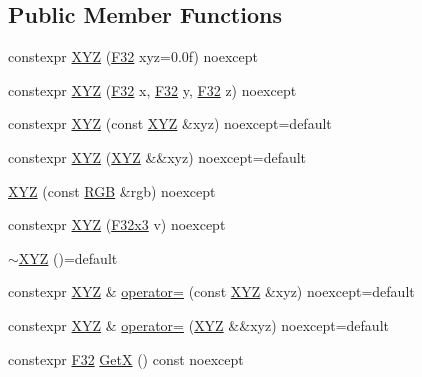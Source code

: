 \subsection*{Public Member Functions}
\begin{DoxyCompactItemize}
\item 
constexpr \mbox{\hyperlink{structmage_1_1_x_y_z_af8b9ef53daa7463097c6397644a24ebf}{X\+YZ}} (\mbox{\hyperlink{namespacemage_aa97e833b45f06d60a0a9c4fc22ae02c0}{F32}} xyz=0.\+0f) noexcept
\item 
constexpr \mbox{\hyperlink{structmage_1_1_x_y_z_af1a6e6dd912ef8513640bd7a45af01d5}{X\+YZ}} (\mbox{\hyperlink{namespacemage_aa97e833b45f06d60a0a9c4fc22ae02c0}{F32}} x, \mbox{\hyperlink{namespacemage_aa97e833b45f06d60a0a9c4fc22ae02c0}{F32}} y, \mbox{\hyperlink{namespacemage_aa97e833b45f06d60a0a9c4fc22ae02c0}{F32}} z) noexcept
\item 
constexpr \mbox{\hyperlink{structmage_1_1_x_y_z_a340b36d0ef87c20f3ff4123e71fb6894}{X\+YZ}} (const \mbox{\hyperlink{structmage_1_1_x_y_z}{X\+YZ}} \&xyz) noexcept=default
\item 
constexpr \mbox{\hyperlink{structmage_1_1_x_y_z_abfabc56fbe50948bc3d894178685453a}{X\+YZ}} (\mbox{\hyperlink{structmage_1_1_x_y_z}{X\+YZ}} \&\&xyz) noexcept=default
\item 
\mbox{\hyperlink{structmage_1_1_x_y_z_a7502d9fa2f8d6bf59d00bcdb45c4fcd0}{X\+YZ}} (const \mbox{\hyperlink{structmage_1_1_r_g_b}{R\+GB}} \&rgb) noexcept
\item 
constexpr \mbox{\hyperlink{structmage_1_1_x_y_z_af2edf71f76a8c7d457229adaf904fb07}{X\+YZ}} (\mbox{\hyperlink{namespacemage_a0fef5ab4e073c2d9ea876fefa3da4233}{F32x3}} v) noexcept
\item 
\mbox{\hyperlink{structmage_1_1_x_y_z_a07eb7ce1ad3308774b0bbad3a7f121ce}{$\sim$\+X\+YZ}} ()=default
\item 
constexpr \mbox{\hyperlink{structmage_1_1_x_y_z}{X\+YZ}} \& \mbox{\hyperlink{structmage_1_1_x_y_z_acf2ea9538d1f6a496557d3d0f2538a0c}{operator=}} (const \mbox{\hyperlink{structmage_1_1_x_y_z}{X\+YZ}} \&xyz) noexcept=default
\item 
constexpr \mbox{\hyperlink{structmage_1_1_x_y_z}{X\+YZ}} \& \mbox{\hyperlink{structmage_1_1_x_y_z_ab162a3b19bdbb5abd84ad77052ac6030}{operator=}} (\mbox{\hyperlink{structmage_1_1_x_y_z}{X\+YZ}} \&\&xyz) noexcept=default
\item 
constexpr \mbox{\hyperlink{namespacemage_aa97e833b45f06d60a0a9c4fc22ae02c0}{F32}} \mbox{\hyperlink{structmage_1_1_x_y_z_ad11318d8920b1782b07c4ac30d4c0204}{GetX}} () const noexcept

\end{DoxyCompactItemize}
